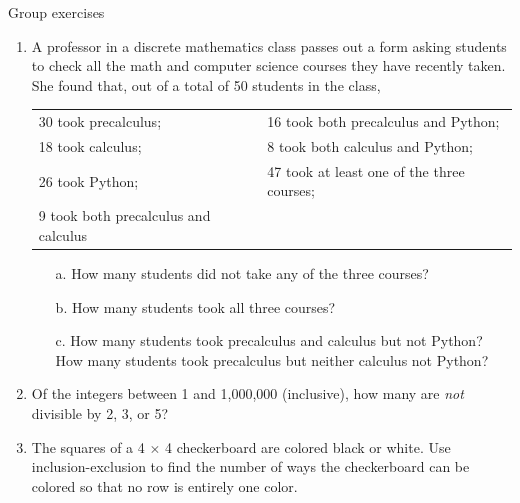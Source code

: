 \documentclass[10pt]{beamer}
\begin{document}
\begin{frame}{Group exercises}
\footnotesize
\begin{enumerate}
	\item A professor in a discrete mathematics class passes out a form asking students to check all the math and computer science courses they have recently taken.  She found that, out of a total of 50 students in the class, 
	
	\begin{tabular}{p{} p{}}
	30 took precalculus; & 16 took both precalculus and Python;\\
	18 took calculus; & 8 took both calculus and Python; \\
	26 took Python; & 47 took at least one of the three courses; \\
	9 took both precalculus and calculus & \\
	\end{tabular}

	\begin{itemize} \footnotesize 
	\item[a.] How many students did not take any of the three courses?
	\item[b.] How many students took all three courses?
	\item[c.] How many students took precalculus and calculus but not Python? How many students took precalculus but neither calculus not Python?
	\end{itemize}
	\item Of the integers between 1 and 1,000,000 (inclusive), how many are \textit{not} divisible by 2, 3, or 5?
	\item The squares of a 4 $\times$ 4 checkerboard are colored black or white.  Use inclusion-exclusion to find the number of ways the checkerboard can be colored so that no row is entirely one color. 
	\end{enumerate}

\end{frame}
\end{document}
